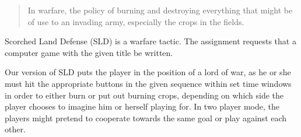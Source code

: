 \begin{quote}
	In warfare, the policy of burning and destroying everything that might be of use to an invading army, especially the crops in the fields.\cite{lab-compendium}
\end{quote}
Scorched Land Defense (SLD) is a warfare tactic. The assignment requests that a computer game with the given title be written.

Our version of SLD puts the player in the position of a lord of war, as he or she must hit the appropriate buttons in the given sequence within set time windows in order to either burn or put out burning crops, depending on which side the player chooses to imagine him or herself playing for.
In two player mode, the players might pretend to cooperate towards the same goal or play against each other. 